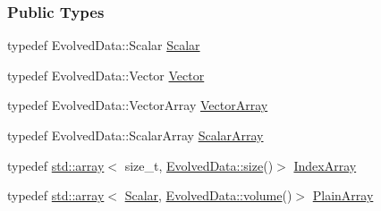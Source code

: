 \subsubsection*{Public Types}
\begin{DoxyCompactItemize}
\item 
typedef Evolved\+Data\+::\+Scalar \mbox{\hyperlink{class_a_rchain_3_01_newtonian_3_01typename_01_evolved_data_1_1_scalar_01_4_00_01_evolved_data_00_01_regularitor_01_4_a2c77dc1b58a25ac5c6ee95dd7809f693}{Scalar}}
\item 
typedef Evolved\+Data\+::\+Vector \mbox{\hyperlink{class_a_rchain_3_01_newtonian_3_01typename_01_evolved_data_1_1_scalar_01_4_00_01_evolved_data_00_01_regularitor_01_4_a0adb648f04fbe3ba3a0289376b56a9e1}{Vector}}
\item 
typedef Evolved\+Data\+::\+Vector\+Array \mbox{\hyperlink{class_a_rchain_3_01_newtonian_3_01typename_01_evolved_data_1_1_scalar_01_4_00_01_evolved_data_00_01_regularitor_01_4_a1ff7d2e64f488df9edae2ad796945bbd}{Vector\+Array}}
\item 
typedef Evolved\+Data\+::\+Scalar\+Array \mbox{\hyperlink{class_a_rchain_3_01_newtonian_3_01typename_01_evolved_data_1_1_scalar_01_4_00_01_evolved_data_00_01_regularitor_01_4_a65b11346d3c11858344b450f2247afd9}{Scalar\+Array}}
\item 
typedef \mbox{\hyperlink{class_a_rchain_aeb4d9b0a28ae3b4e4286edf838e5a905}{std\+::array}}$<$ size\+\_\+t, \mbox{\hyperlink{class_a_rchain_ac612af46ce057d56dc47a6d28738a4cf}{Evolved\+Data\+::size}}()$>$ \mbox{\hyperlink{class_a_rchain_3_01_newtonian_3_01typename_01_evolved_data_1_1_scalar_01_4_00_01_evolved_data_00_01_regularitor_01_4_a0072f8585c3e6ba8d64cb81be90fb376}{Index\+Array}}
\item 
typedef \mbox{\hyperlink{class_a_rchain_aeb4d9b0a28ae3b4e4286edf838e5a905}{std\+::array}}$<$ \mbox{\hyperlink{class_a_rchain_3_01_newtonian_3_01typename_01_evolved_data_1_1_scalar_01_4_00_01_evolved_data_00_01_regularitor_01_4_a2c77dc1b58a25ac5c6ee95dd7809f693}{Scalar}}, \mbox{\hyperlink{classparticle_system_aac9e6701e4486c89b508a2508b77089b}{Evolved\+Data\+::volume}}()$>$ \mbox{\hyperlink{class_a_rchain_3_01_newtonian_3_01typename_01_evolved_data_1_1_scalar_01_4_00_01_evolved_data_00_01_regularitor_01_4_a8cf940df8dabb6c78662f839c2b13c9a}{Plain\+Array}}
\end{DoxyCompactItemize}
